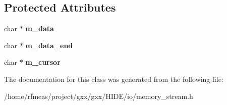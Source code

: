 \subsection*{Protected Attributes}
\begin{DoxyCompactItemize}
\item 
char $\ast$ {\bfseries m\+\_\+data}\hypertarget{classgxx_1_1memory__stream_a760d7259c60584527a8d041b7139c9eb}{}\label{classgxx_1_1memory__stream_a760d7259c60584527a8d041b7139c9eb}

\item 
char $\ast$ {\bfseries m\+\_\+data\+\_\+end}\hypertarget{classgxx_1_1memory__stream_a78cb51250f0832ba6ad4b1e074f2b042}{}\label{classgxx_1_1memory__stream_a78cb51250f0832ba6ad4b1e074f2b042}

\item 
char $\ast$ {\bfseries m\+\_\+cursor}\hypertarget{classgxx_1_1memory__stream_a3ec994db0f89f628a9dc6bbd0addefdf}{}\label{classgxx_1_1memory__stream_a3ec994db0f89f628a9dc6bbd0addefdf}

\end{DoxyCompactItemize}


The documentation for this class was generated from the following file\+:\begin{DoxyCompactItemize}
\item 
/home/rfmeas/project/gxx/gxx/\+H\+I\+D\+E/io/memory\+\_\+stream.\+h\end{DoxyCompactItemize}
